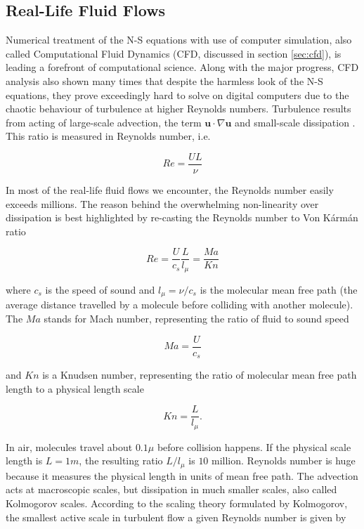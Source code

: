 \subsection{Real-Life Fluid Flows}
Numerical treatment of the N-S equations with use of computer simulation, also called Computational Fluid Dynamics (CFD, discussed in section \ref{sec:cfd}), is leading a forefront of computational science. Along with the major progress, CFD analysis also shown many times that despite the harmless look of the N-S equations, they prove exceedingly hard to solve on digital computers due to the chaotic behaviour of turbulence at higher Reynolds numbers. Turbulence results from acting of large-scale advection, the term $\bm{u}\cdot \nabla\bm{u}$ and small-scale dissipation \citep{succi2018}. This ratio is measured in Reynolds number, i.e.

\begin{equation}
Re = \frac{UL}{\nu}
\end{equation}

In most of the real-life fluid flows we encounter, the Reynolds number easily exceeds millions. The reason behind the overwhelming non-linearity over dissipation is best highlighted by re-casting the Reynolds number to Von Kármán ratio

\begin{equation}
	Re = \frac{U}{c_s} \frac{L}{l_\mu} = \frac{Ma}{Kn}
\end{equation}

where $c_s$ is the speed of sound and $l_\mu = \nu / c_s$ is the molecular mean free path (the average distance travelled by a molecule before colliding with another molecule). The $Ma$ stands for Mach number, representing the ratio of fluid to sound speed

\begin{equation}
	Ma = \frac{U}{c_s}
\end{equation}

and $Kn$ is a Knudsen number, representing the ratio of molecular mean free path length to a physical length scale

\begin{equation}
	Kn = \frac{L}{l_\mu}.
\end{equation}

In air, molecules travel about $0.1\mu$ before collision happens. If the physical scale length is $L = 1m$, the resulting ratio $L/l_\mu$ is $10$ million. Reynolds number is huge because it measures the physical length in units of mean free path. The advection acts at macroscopic scales, but dissipation in much smaller scales, also called Kolmogorov scales. According to the scaling theory formulated by Kolmogorov, the smallest active scale in turbulent flow a given Reynolds number is given by

